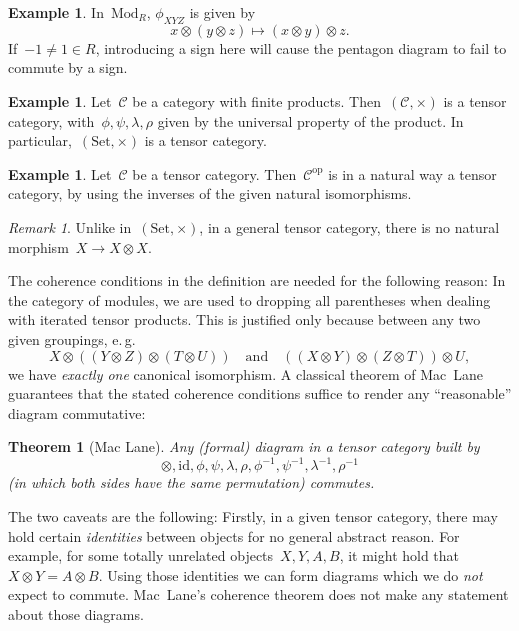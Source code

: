 \documentclass[a4paper,english,12pt]{scrartcl}
\theoremstyle{definition}
\newtheorem{ex}[defn]{Example}
\theoremstyle{plain}
\newtheorem{thm}[defn]{Theorem}
\theoremstyle{remark}
\newtheorem{rem}[defn]{Remark}
\newcommand{\C}{\mathcal{C}}
\newcommand{\id}{\mathrm{id}}
\newcommand{\op}{\mathrm{op}}
\renewcommand{\_}{\mathpunct{.}\,}
\newcommand{\?}{\,{:}\,}
\newcommand{\Mod}{\mathrm{Mod}}
\newcommand{\Set}{\mathrm{Set}}
\begin{document}
\begin{ex}In~$\Mod_R$, $\phi_{XYZ}$ is given by
\[ x \otimes (y \otimes z) \longmapsto (x \otimes y) \otimes z. \]
If~$-1 \neq 1 \in R$, introducing a sign here will cause the pentagon diagram
to fail to commute by a sign.\end{ex}

\begin{ex}Let~$\C$ be a category with finite products. Then~$(\C,\times)$ is a
tensor category, with~$\phi, \psi, \lambda, \rho$ given by the universal
property of the product. In particular,~$(\Set,\times)$ is a tensor
category.\end{ex}

\begin{ex}Let~$\C$ be a tensor category. Then~$\C^\op$ is in a natural way a
tensor category, by using the inverses of the given natural
isomorphisms.\end{ex}

\begin{rem}Unlike in~$(\Set,\times)$, in a general tensor category, there is no
natural morphism~$X \to X \otimes X$.\end{rem}

The coherence conditions in the definition are needed for the following reason:
In the category of modules, we are used to dropping all parentheses when
dealing with iterated tensor products. This is justified only because between any
two given groupings, e.\,g.
\[ X \otimes ((Y \otimes Z) \otimes (T \otimes U)) \quad\text{and}\quad
  ((X \otimes Y) \otimes (Z \otimes T)) \otimes U, \]
we have \emph{exactly one} canonical isomorphism. A classical theorem of Mac~Lane
guarantees that the stated coherence conditions suffice to render any
``reasonable'' diagram commutative:

\begin{thm}[Mac Lane]Any (formal) diagram in a tensor category built
by \[
\otimes,\id,\phi,\psi,\lambda,\rho,\phi^{-1},\psi^{-1},\lambda^{-1},\rho^{-1}
\]
(in which both sides have the same permutation) commutes.\end{thm}

The two caveats are the following: Firstly, in a given tensor category, there
may hold certain \emph{identities} between objects for no general abstract
reason. For example, for some totally unrelated objects~$X,Y,A,B$, it might
hold that $X \otimes Y = A \otimes B$. Using those identities we can form
diagrams which we do \emph{not} expect to commute. Mac~Lane's coherence theorem
does not make any statement about those diagrams.
\end{document}
